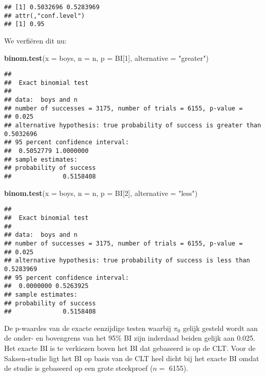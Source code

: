 \documentclass[12pt,dutch,coursenotes]{book}
\newenvironment{Shaded}{\begin{snugshade}}{\end{snugshade}}
\newcommand{\KeywordTok}[1]{\textcolor[rgb]{0.13,0.29,0.53}{\textbf{#1}}}
\newcommand{\DataTypeTok}[1]{\textcolor[rgb]{0.13,0.29,0.53}{#1}}
\newcommand{\DecValTok}[1]{\textcolor[rgb]{0.00,0.00,0.81}{#1}}
\newcommand{\StringTok}[1]{\textcolor[rgb]{0.31,0.60,0.02}{#1}}
\newcommand{\NormalTok}[1]{#1}
\theoremstyle{definition}
\theoremstyle{definition}
\theoremstyle{definition}
\theoremstyle{remark}
\begin{document}
\begin{verbatim}
## [1] 0.5032696 0.5283969
## attr(,"conf.level")
## [1] 0.95
\end{verbatim}

We verfiëren dit nu:

\begin{Shaded}
\begin{Highlighting}[]
\KeywordTok{binom.test}\NormalTok{(}\DataTypeTok{x =}\NormalTok{ boys, }\DataTypeTok{n =}\NormalTok{ n, }\DataTypeTok{p =}\NormalTok{ BI[}\DecValTok{1}\NormalTok{], }\DataTypeTok{alternative =} \StringTok{"greater"}\NormalTok{)}
\end{Highlighting}
\end{Shaded}

\begin{verbatim}
## 
##  Exact binomial test
## 
## data:  boys and n
## number of successes = 3175, number of trials = 6155, p-value =
## 0.025
## alternative hypothesis: true probability of success is greater than 0.5032696
## 95 percent confidence interval:
##  0.5052779 1.0000000
## sample estimates:
## probability of success 
##              0.5158408
\end{verbatim}

\begin{Shaded}
\begin{Highlighting}[]
\KeywordTok{binom.test}\NormalTok{(}\DataTypeTok{x =}\NormalTok{ boys, }\DataTypeTok{n =}\NormalTok{ n, }\DataTypeTok{p =}\NormalTok{ BI[}\DecValTok{2}\NormalTok{], }\DataTypeTok{alternative =} \StringTok{"less"}\NormalTok{)}
\end{Highlighting}
\end{Shaded}

\begin{verbatim}
## 
##  Exact binomial test
## 
## data:  boys and n
## number of successes = 3175, number of trials = 6155, p-value =
## 0.025
## alternative hypothesis: true probability of success is less than 0.5283969
## 95 percent confidence interval:
##  0.0000000 0.5263925
## sample estimates:
## probability of success 
##              0.5158408
\end{verbatim}

De p-waardes van de exacte eenzijdige testen waarbij \(\pi_0\) gelijk
gesteld wordt aan de onder- en bovengrens van het 95\% BI zijn inderdaad
beiden gelijk aan 0.025. Het exacte BI is te verkiezen boven het BI dat
gebaseerd is op de CLT. Voor de Saksen-studie ligt het BI op basis van
de CLT heel dicht bij het exacte BI omdat de studie is gebaseerd op een
grote steekproef (\(n=\) 6155).
\end{document}
